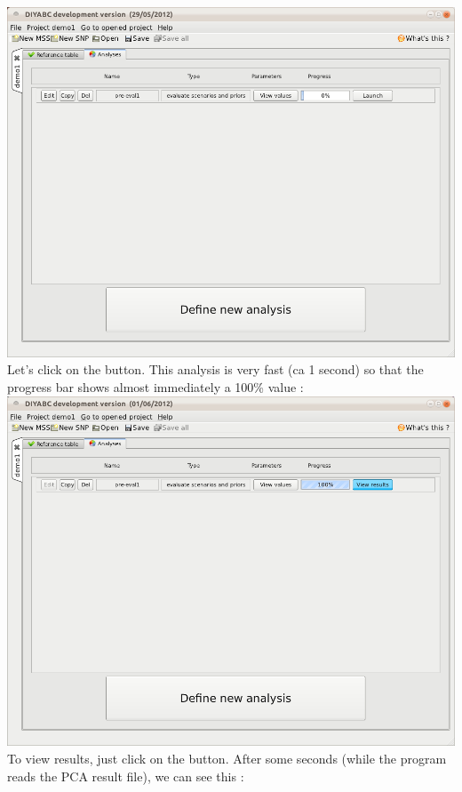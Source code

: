 \includegraphics[scale=0.35]{gui_pictures/Capture-DIYABC-30.png} \\

Let's click on the  button. This analysis is very fast (ca 1 second) so that the progress bar shows almost immediately a 100\% value : \\

\includegraphics[scale=0.35]{gui_pictures/Capture-DIYABC-31.png} \\

To view results, just click on the  button. After some seconds (while the program reads the PCA result file), we can see this : \\

